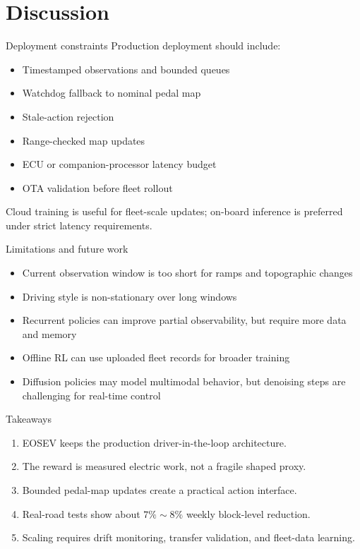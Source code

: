 \documentclass[aspectratio=169,professionalfonts]{beamer}
\begin{document}
\section*{Discussion}
\label{sec:org63b47e1}

\begin{frame}[label={sec:org20b6c0f}]{Deployment constraints}
Production deployment should include:

\begin{itemize}
\item Timestamped observations and bounded queues
\item Watchdog fallback to nominal pedal map
\item Stale-action rejection
\item Range-checked map updates
\item ECU or companion-processor latency budget
\item OTA validation before fleet rollout
\end{itemize}

\vspace{0.5em}

Cloud training is useful for fleet-scale updates; on-board inference is
preferred under strict latency requirements.
\end{frame}
\begin{frame}[label={sec:orgf169e1a}]{Limitations and future work}
\begin{itemize}
\item Current observation window is too short for ramps and topographic
changes
\item Driving style is non-stationary over long windows
\item Recurrent policies can improve partial observability, but require more
data and memory
\item Offline RL can use uploaded fleet records for broader training
\item Diffusion policies may model multimodal behavior, but denoising steps
are challenging for real-time control
\end{itemize}
\end{frame}
\begin{frame}[label={sec:orgfc07314}]{Takeaways}
\begin{enumerate}
\item EOSEV keeps the production driver-in-the-loop architecture.
\item The reward is measured electric work, not a fragile shaped proxy.
\item Bounded pedal-map updates create a practical action interface.
\item Real-road tests show about \(7\%\sim8\%\) weekly block-level reduction.
\item Scaling requires drift monitoring, transfer validation, and fleet-data
learning.
\end{enumerate}
\end{frame}
\end{document}
